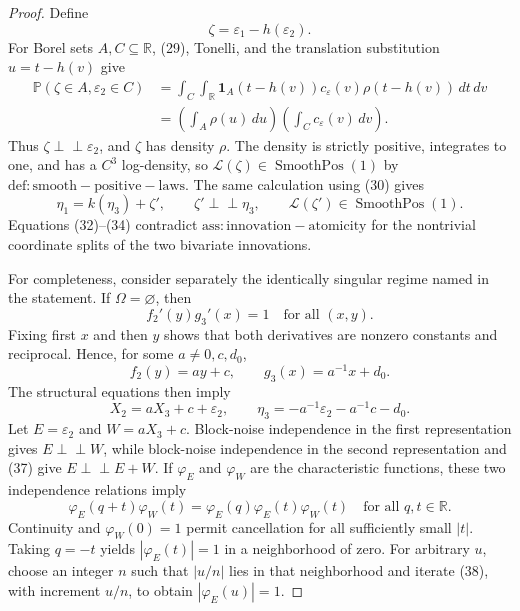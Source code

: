 \documentclass{article}
\begin{document}
\begin{proof}
Define
\[
 \zeta=\varepsilon_1-h(\varepsilon_2).
\tag{32}
\]
For Borel sets \(A,C\subseteq\mathbb R\), (29), Tonelli, and the translation substitution \(u=t-h(v)\) give
\[
 \begin{aligned}
 \mathbb P(\zeta\in A,\varepsilon_2\in C)
 &=\int_C\int_{\mathbb R}{\mathbf 1}_A(t-h(v))
 c_\varepsilon(v)\rho(t-h(v))\,dt\,dv\\
 &=\left(\int_A\rho(u)\,du\right)
   \left(\int_Cc_\varepsilon(v)\,dv\right).
 \end{aligned}
\tag{33}
\]
Thus \(\zeta\perp\!\!\!\perp\varepsilon_2\), and \(\zeta\) has density \(\rho\).  The density is strictly positive, integrates to one, and has a \(C^3\) log-density, so \(\mathcal L(\zeta)\in\operatorname{SmoothPos}(1)\) by \(\mathrm{def:smooth-positive-laws}\).  The same calculation using (30) gives
\[
 \eta_1=k(\eta_3)+\zeta',
 \qquad \zeta'\perp\!\!\!\perp\eta_3,
 \qquad \mathcal L(\zeta')\in\operatorname{SmoothPos}(1).
\tag{34}
\]
Equations (32)--(34) contradict \(\mathrm{ass:innovation-atomicity}\) for the nontrivial coordinate splits of the two bivariate innovations.

For completeness, consider separately the identically singular regime named in the statement.  If \(\Omega=\varnothing\), then
\[
 f_2'(y)g_3'(x)=1\quad\text{for all }(x,y).
\tag{35}
\]
Fixing first \(x\) and then \(y\) shows that both derivatives are nonzero constants and reciprocal.  Hence, for some \(a\ne0,c,d_0\),
\[
 f_2(y)=ay+c,
 \qquad g_3(x)=a^{-1}x+d_0.
\tag{36}
\]
The structural equations then imply
\[
 X_2=aX_3+c+\varepsilon_2,
 \qquad
 \eta_3=-a^{-1}\varepsilon_2-a^{-1}c-d_0.
\tag{37}
\]
Let \(E=\varepsilon_2\) and \(W=aX_3+c\).  Block-noise independence in the first representation gives \(E\perp\!\!\!\perp W\), while block-noise independence in the second representation and (37) give \(E\perp\!\!\!\perp E+W\).  If \(\varphi_E\) and \(\varphi_W\) are the characteristic functions, these two independence relations imply
\[
 \varphi_E(q+t)\varphi_W(t)
 =\varphi_E(q)\varphi_E(t)\varphi_W(t)
 \quad\text{for all }q,t\in\mathbb R.
\tag{38}
\]
Continuity and \(\varphi_W(0)=1\) permit cancellation for all sufficiently small \(|t|\).  Taking \(q=-t\) yields \(|\varphi_E(t)|=1\) in a neighborhood of zero.  For arbitrary \(u\), choose an integer \(n\) such that \(|u/n|\) lies in that neighborhood and iterate (38), with increment \(u/n\), to obtain \(|\varphi_E(u)|=1\).


\end{proof}
\end{document}
